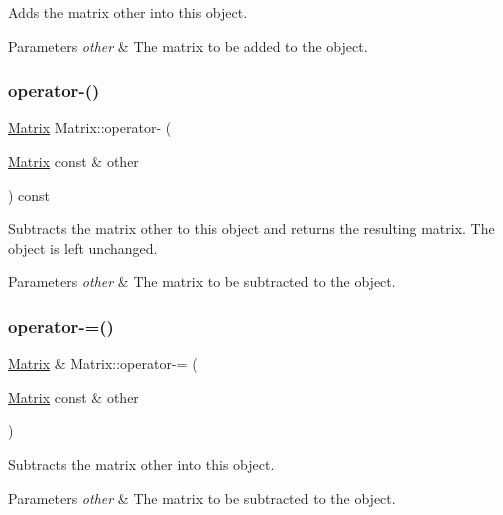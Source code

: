 Adds the matrix {\ttfamily other} into this object.


\begin{DoxyParams}{Parameters}
{\em other} & The matrix to be added to the object. \\
\hline
\end{DoxyParams}
\mbox{\label{classMatrix_a5f7129af600c22b69abdcb2c3b204e5a}} 
\subsubsection{\texorpdfstring{operator-\/()}{operator-()}}
{\footnotesize\ttfamily \hyperlink{classMatrix}{Matrix} Matrix\+::operator-\/ (\begin{DoxyParamCaption}\item[{\hyperlink{classMatrix}{Matrix} const \&}]{other }\end{DoxyParamCaption}) const}

Subtracts the matrix {\ttfamily other} to this object and returns the resulting matrix. The object is left unchanged.


\begin{DoxyParams}{Parameters}
{\em other} & The matrix to be subtracted to the object. \\
\hline
\end{DoxyParams}
\mbox{\label{classMatrix_a5871f028dc8b3ae8043a942b5840cdec}} 
\subsubsection{\texorpdfstring{operator-\/=()}{operator-=()}}
{\footnotesize\ttfamily \hyperlink{classMatrix}{Matrix} \& Matrix\+::operator-\/= (\begin{DoxyParamCaption}\item[{\hyperlink{classMatrix}{Matrix} const \&}]{other }\end{DoxyParamCaption})}

Subtracts the matrix {\ttfamily other} into this object.


\begin{DoxyParams}{Parameters}
{\em other} & The matrix to be subtracted to the object. \\
\hline
\end{DoxyParams}
\mbox{\label{classMatrix_a25cb20c90560327240a07d81ed11c746}} 
